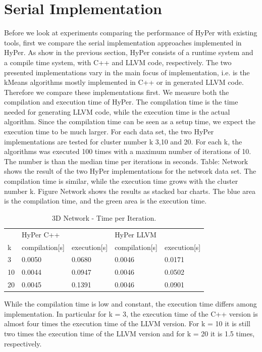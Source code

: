 \section{Serial Implementation}

Before we look at experiments comparing the performance of HyPer with existing tools, first we compare the serial implementation approaches implemented in HyPer. As show in the previous section, HyPer consists of a runtime system and a compile time system, with C++ and LLVM code, respectively.
The two presented implementations vary in the main focus of implementation, i.e. is the kMeans algorithms mostly implemented in C++ or in generated LLVM code. Therefore we compare these implementations first. We measure both the compilation and execution time of HyPer. The compilation time is the time needed for generating LLVM code, while the execution time is the actual algorithm. Since the compilation time can be seen as a setup time, we expect the execution time to be much larger.
For each data set, the two HyPer implementations are tested for cluster number k 3,10 and 20. For each k, the algorithms was executed 100 times with a maximum number of iterations of 10. The number is than the median time per iterations in seconds.
Table: Network shows the result of the two HyPer implementations for the network data set. The compilation time is similar, while the execution time grows with the cluster number k. Figure Network shows the results as stacked bar charts. The blue area is the compilation time, and the green area is the execution time.

\begin{table}[htsb]
  \caption[3D Network - Time per Iteration]{3D Network - Time per Iteration.}\label{tab:network_serial}
  \centering
  \begin{tabular}{l l l l l}
    \toprule
      & HyPer C++ & & HyPer LLVM & \\
      k & compilation[s] & execution[s] & compilation[s] & execution[s] \\
    \midrule
      3 & 0.0050 & 0.0680 & 0.0046 & 0.0171 \\
      10 & 0.0044 & 0.0947 & 0.0046 & 0.0502 \\
      20 & 0.0045 & 0.1391 & 0.0046 & 0.0901 \\
    \bottomrule
  \end{tabular}
\end{table}


While the compilation time is low and constant, the execution time differs among implementation. In particular for k = 3, the execution time of the C++ version is almost four times the execution time of the LLVM version. For k = 10 it is still two times the execution time of the LLVM version and for k = 20 it is 1.5 times, respectively.


